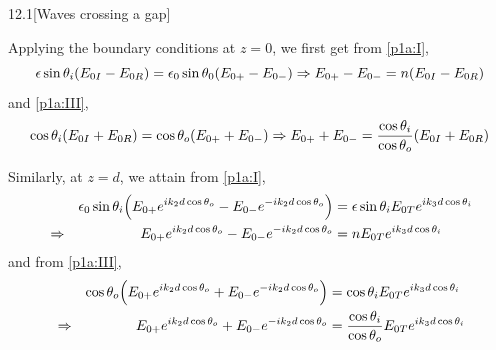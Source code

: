 \documentclass[12pt]{article}
\begin{document}
\begin{problem}{12.1}[Waves crossing a gap]
\begin{solution}
\begin{subequations}
\end{subequations}
Applying the boundary conditions at $z=0$, we first get from \eqref{p1a:I},
\begin{equation}\label{p1a:1}
    \epsilon\sin\theta_i(E_{0I}-E_{0R})
    =\epsilon_0\sin\theta_0\qty(E_{0+}-E_{0-})
    \Rightarrow E_{0+}-E_{0-}=n(E_{0I}-E_{0R})
\end{equation}
and \eqref{p1a:III},
\begin{equation}\label{p1a:2}
    \cos\theta_i(E_{0I}+E_{0R})=\cos\theta_o\qty(E_{0+}+E_{0-})
    \Rightarrow E_{0+}+E_{0-}=\frac{\cos\theta_i}{\cos\theta_o}(E_{0I}+E_{0R})
\end{equation}

Similarly, at $z=d$, we attain from \eqref{p1a:I},
\begin{align}\label{p1a:3}
    &&\epsilon_0\sin\theta_i
    \qty(E_{0+}e^{ik_2d\cos\theta_o}-E_{0-}e^{-ik_2d\cos\theta_o}) 
    &=\epsilon\sin\theta_i E_{0T} e^{ik_3d\cos\theta_i}\notag\\
    &\Rightarrow&
    E_{0+}e^{ik_2d\cos\theta_o}-E_{0-}e^{-ik_2d\cos\theta_o}
    &=nE_{0T}e^{ik_3d\cos\theta_i}
\end{align}
and from \eqref{p1a:III},
\begin{align}\label{p1a:4}
    &&\cos\theta_o
    \qty(E_{0+}e^{ik_2d\cos\theta_o}+E_{0-}e^{-ik_2d\cos\theta_o}) 
    &=\cos\theta_i E_{0T}e^{ik_3d\cos\theta_i}\notag\\
    &\Rightarrow&
    E_{0+}e^{ik_2d\cos\theta_o}+E_{0-}e^{-ik_2d\cos\theta_o}
    &=\frac{\cos\theta_i}{\cos\theta_o}E_{0T}e^{ik_3d\cos\theta_i}
\end{align}


\end{solution}
\end{problem}
\end{document}
